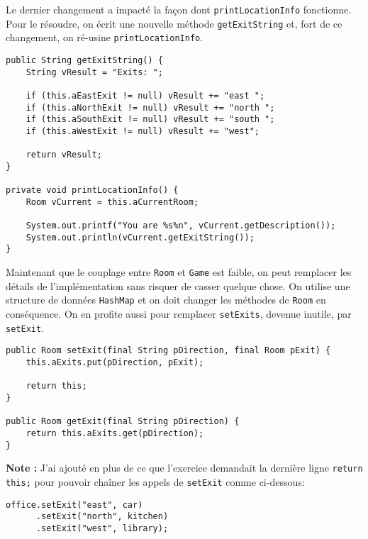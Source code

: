 \begin{exercise}[subtitle=getExitString]
Le dernier changement a impacté la façon dont \verb|printLocationInfo| fonctionne. Pour le résoudre, on écrit une nouvelle méthode \verb|getExitString| et, fort de ce changement, on ré-usine \verb|printLocationInfo|.

\begin{verbatim}
public String getExitString() {
    String vResult = "Exits: ";

    if (this.aEastExit != null) vResult += "east ";
    if (this.aNorthExit != null) vResult += "north ";
    if (this.aSouthExit != null) vResult += "south ";
    if (this.aWestExit != null) vResult += "west";

    return vResult;
}

private void printLocationInfo() {
    Room vCurrent = this.aCurrentRoom;

    System.out.printf("You are %s%n", vCurrent.getDescription());
    System.out.println(vCurrent.getExitString());
}
\end{verbatim}
\end{exercise}

\begin{exercise}[subtitle=HashMap et setExit]

Maintenant que le couplage entre \verb|Room| et \verb|Game| est faible, on peut remplacer les détails de l'implémentation sans risquer de casser quelque chose. On utilise une structure de données \verb|HashMap| et on doit changer les méthodes de \verb|Room| en conséquence. On en profite aussi pour remplacer \verb|setExits|, devenue inutile, par \verb|setExit|.

\begin{verbatim}
public Room setExit(final String pDirection, final Room pExit) {
    this.aExits.put(pDirection, pExit);

    return this;
}

public Room getExit(final String pDirection) {
    return this.aExits.get(pDirection);
}
\end{verbatim}
\end{exercise}

\textbf{Note :} J'ai ajouté en plus de ce que l'exercice demandait la dernière ligne \texttt{return this;} pour pouvoir chaîner les appels de \verb|setExit| comme ci-dessous:

\begin{verbatim}
office.setExit("east", car)
      .setExit("north", kitchen)
      .setExit("west", library);
\end{verbatim}

